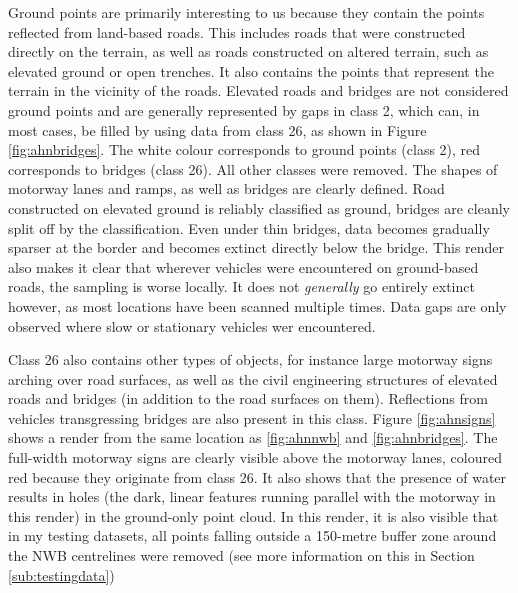 Ground points are primarily interesting to us because they contain the points reflected from land-based roads. This includes roads that were constructed directly on the terrain, as well as roads constructed on altered terrain, such as elevated ground or open trenches. It also contains the points that represent the terrain in the vicinity of the roads. Elevated roads and bridges are not considered ground points and are generally represented by gaps in class 2, which can, in most cases, be filled by using data from class 26, as shown in Figure \ref{fig:ahnbridges}. The white colour corresponds to ground points (class 2), red corresponds to bridges (class 26). All other classes were removed. The shapes of motorway lanes and ramps, as well as bridges are clearly defined. Road constructed on elevated ground is reliably classified as ground, bridges are cleanly split off by the classification. Even under thin bridges, data becomes gradually sparser at the border and becomes extinct directly below the bridge. This render also makes it clear that wherever vehicles were encountered on ground-based roads, the sampling is worse locally. It does not \textit{generally} go entirely extinct however, as most locations have been scanned multiple times. Data gaps are only observed where slow or stationary vehicles wer encountered.

Class 26 also contains other types of objects, for instance large motorway signs arching over road surfaces, as well as the civil engineering structures of elevated roads and bridges (in addition to the road surfaces on them). Reflections from vehicles transgressing bridges are also present in this class. Figure \ref{fig:ahnsigns} shows a render from the same location as \ref{fig:ahnnwb} and \ref{fig:ahnbridges}. The full-width motorway signs are clearly visible above the motorway lanes, coloured red because they originate from class 26. It also shows that the presence of water results in holes (the dark, linear features running parallel with the motorway in this render) in the ground-only point cloud. In this render, it is also visible that in my testing datasets, all points falling outside a 150-metre buffer zone around the NWB centrelines were removed (see more information on this in Section \ref{sub:testingdata})

